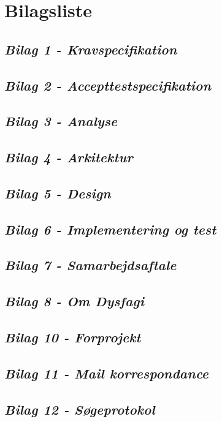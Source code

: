 \chapter{Bilagsliste}
\section*{\textit{Bilag 1 - Kravspecifikation}} \label{bilag1}
\section*{\textit{Bilag 2 - Accepttestspecifikation}} \label{bilag2}
\section*{\textit{Bilag 3 - Analyse}} \label{bilag3}
\section*{\textit{Bilag 4 - Arkitektur}} \label{bilag4}
\section*{\textit{Bilag 5 - Design}} \label{bilag5}
\section*{\textit{Bilag 6 - Implementering og test}} \label{bilag6}
\section*{\textit{Bilag 7 - Samarbejdsaftale}} \label{bilag7}
\section*{\textit{Bilag 8 - Om Dysfagi}} \label{bilag8}
\section*{\textit{Bilag 10 - Forprojekt}} \label{bilag10}
\section*{\textit{Bilag 11 - Mail korrespondance}} \label{bilag11}
\section*{\textit{Bilag 12 - Søgeprotokol}} \label{bilag12}
